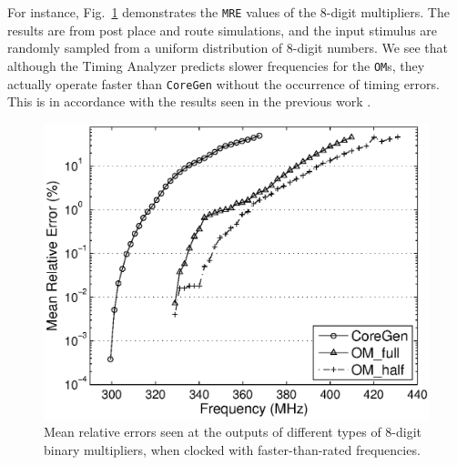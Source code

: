\documentclass[conference]{IEEEtran}
\begin{document}
For instance, Fig.~\ref{Fig:PM_MRE} demonstrates the \texttt{MRE} values of the 8-digit multipliers. The results are from post place and route simulations, and the input stimulus are randomly sampled from a uniform distribution of 8-digit numbers. We see that although the Timing Analyzer predicts slower frequencies for the \texttt{OM}s, they actually operate faster than \texttt{CoreGen} without the occurrence of timing errors. This is in accordance with the results seen in the previous work \cite{SKDAC14_REVIEW}.

\begin{figure}[tbp]
  \centering
  \includegraphics[width=.48\textwidth]{./Figures/Exp/MRE_PM.eps}
  \vspace{-3ex}
  \caption{Mean relative errors seen at the outputs of different types of 8-digit binary multipliers, when clocked with faster-than-rated frequencies.}
  \label{Fig:PM_MRE}
  \vspace{-1ex}
\end{figure}




%
\end{document}
